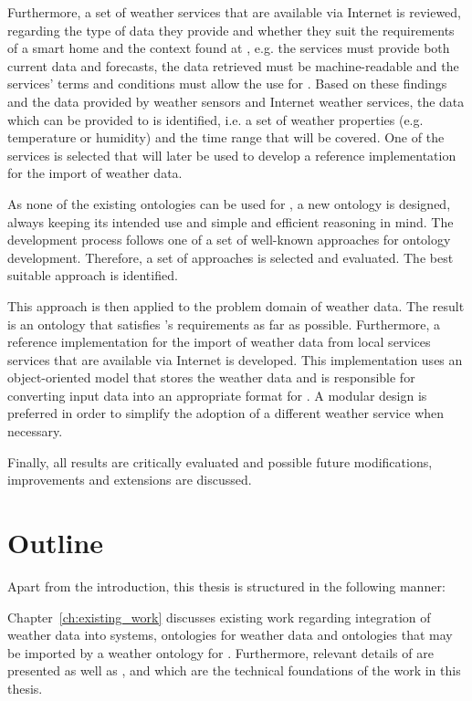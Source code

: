 Furthermore, a set of weather services that are available via Internet is reviewed, regarding the type of data they provide and whether they suit the requirements of a smart home and the context found at \thinkhome, e.g. the services must provide both current data and forecasts, the data retrieved must be machine-readable and the services' terms and conditions must allow the use for \thinkhome. Based on these findings and the data provided by weather sensors and Internet weather services, the data which can be provided to \thinkhome is identified, i.e. a set of weather properties (e.g. temperature or humidity) and the time range that will be covered. One of the services is selected that will later be used to develop a reference implementation for the import of weather data.

As none of the existing ontologies can be used for \thinkhome, a new  ontology is designed, always keeping its intended use and simple and efficient reasoning in mind. The development process follows one of a set of well-known approaches for ontology development. Therefore, a set of approaches is selected and evaluated. The best suitable approach is identified.

This approach is then applied to the problem domain of weather data. The result is an ontology that satisfies \thinkhome's requirements as far as possible. Furthermore, a reference implementation for the import of weather data from local services services that are available via Internet is developed. This implementation uses an object-oriented model that stores the weather data and is responsible for converting input data into an appropriate format for \thinkhome. A modular design is preferred in order to simplify the adoption of a different weather service when necessary.

Finally, all results are critically evaluated and possible future modifications, improvements and extensions are discussed.

\section{Outline}

Apart from the introduction, this thesis is structured in the following manner:

Chapter~\ref{ch:existing_work} discusses existing work regarding integration of weather data into \smarthome systems, ontologies for weather data and ontologies that may be imported by a weather ontology for \thinkhome. Furthermore, relevant details of \thinkhome are presented as well as ,  and  which are the technical foundations of the work in this thesis.

